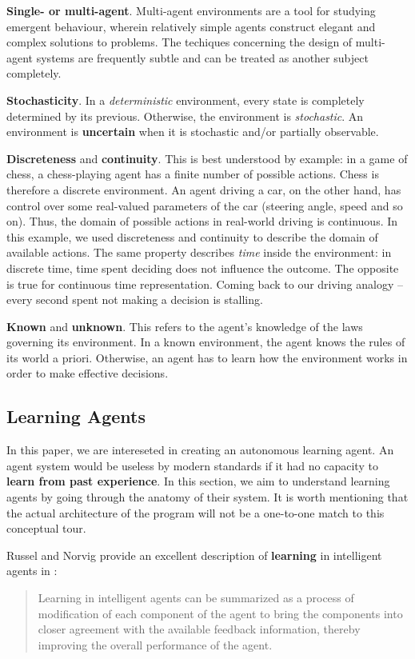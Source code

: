 \textbf{Single- or multi-agent}.
Multi-agent environments are a tool for studying emergent behaviour, wherein relatively simple agents construct elegant and complex solutions to problems.
The techiques concerning the design of multi-agent systems are frequently subtle and can be treated as another subject completely.

\textbf{Stochasticity}.
In a \emph{deterministic} environment, every state is completely determined by its previous. Otherwise, the environment is \emph{stochastic}. An environment is \textbf{uncertain} when it is stochastic and/or partially observable.

\textbf{Discreteness} and \textbf{continuity}.
This is best understood by example:
in a game of chess, a chess-playing agent has a finite number of possible actions.
Chess is therefore a discrete environment.
An agent driving a car, on the other hand, has control over some real-valued parameters of the car (steering angle, speed and so on).
Thus, the domain of possible actions in real-world driving is continuous.
In this example, we used discreteness and continuity to describe the domain of available actions.
The same property describes \emph{time} inside the environment: in discrete time, time spent deciding does not influence the outcome. The opposite is true for continuous time representation. Coming back to our driving analogy -- every second spent not making a decision is stalling.

\textbf{Known} and \textbf{unknown}.
This refers to the agent's knowledge of the laws governing its environment. In a known environment, the agent knows the rules of its world a priori. Otherwise, an agent has to learn how the environment works in order to make effective decisions.


\subsection{Learning Agents} \label{learning-agents}
In this paper, we are intereseted in creating an autonomous learning agent.
An agent system would be useless by modern standards if it had no capacity to \textbf{learn from past experience}.
In this section, we aim to understand learning agents by going through the anatomy of their system.
It is worth mentioning that the actual architecture of the program will not be a one-to-one match to this conceptual tour.

Russel and Norvig provide an excellent description of \textbf{learning} in intelligent agents in \cite{aima}:
\begin{quote}
    Learning in intelligent agents can be summarized as a process of modification of each component of the agent to bring the components into closer agreement with the available feedback information, thereby improving the overall performance of the agent.
\end{quote}

